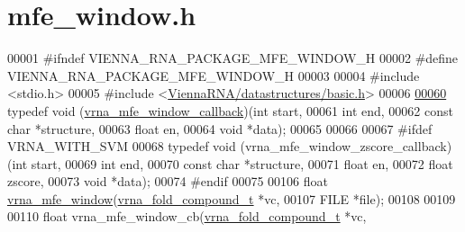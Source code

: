\hypertarget{mfe__window_8h_source}{}\section{mfe\+\_\+window.\+h}
\label{mfe__window_8h_source}

\begin{DoxyCode}
00001 \textcolor{preprocessor}{#ifndef VIENNA\_RNA\_PACKAGE\_MFE\_WINDOW\_H}
00002 \textcolor{preprocessor}{#define VIENNA\_RNA\_PACKAGE\_MFE\_WINDOW\_H}
00003 
00004 \textcolor{preprocessor}{#include <stdio.h>}
00005 \textcolor{preprocessor}{#include <\hyperlink{datastructures_2basic_8h}{ViennaRNA/datastructures/basic.h}>}
00006 
\hyperlink{group__mfe__window_ga4f3e5bc214ef803074ace313cb9571b4}{00060} \textcolor{keyword}{typedef} void (\hyperlink{group__mfe__window_ga4f3e5bc214ef803074ace313cb9571b4}{vrna\_mfe\_window\_callback})(\textcolor{keywordtype}{int}         start,
00061                                         \textcolor{keywordtype}{int}         end,
00062                                         \textcolor{keyword}{const} \textcolor{keywordtype}{char}  *structure,
00063                                         \textcolor{keywordtype}{float}       en,
00064                                         \textcolor{keywordtype}{void}        *data);
00065 
00066 
00067 \textcolor{preprocessor}{#ifdef VRNA\_WITH\_SVM}
00068 \textcolor{keyword}{typedef} void (vrna\_mfe\_window\_zscore\_callback)(\textcolor{keywordtype}{int}        start,
00069                                                \textcolor{keywordtype}{int}        end,
00070                                                \textcolor{keyword}{const} \textcolor{keywordtype}{char} *structure,
00071                                                \textcolor{keywordtype}{float}      en,
00072                                                \textcolor{keywordtype}{float}      zscore,
00073                                                \textcolor{keywordtype}{void}       *data);
00074 \textcolor{preprocessor}{#endif}
00075 
00106 \textcolor{keywordtype}{float} \hyperlink{group__mfe__window_ga689df235a1915a1ad56e377383c044ce}{vrna\_mfe\_window}(\hyperlink{group__fold__compound_structvrna__fc__s}{vrna\_fold\_compound\_t}  *vc,
00107                       FILE                  *file);
00108 
00109 
00110 \textcolor{keywordtype}{float} vrna\_mfe\_window\_cb(\hyperlink{group__fold__compound_structvrna__fc__s}{vrna\_fold\_compound\_t}     *vc,

\end{DoxyCode}
